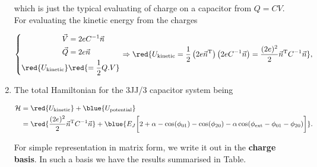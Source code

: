 \begin{enumerate}
  \noindent which is just the typical  evaluating of charge on a capacitor from $ Q =  CV $.  For evaluating the kinetic
  energy from the charges

  \begin{equation}
    \left\lbrace \begin{aligned}
        \vec{V} & = 2eC^{-1}\vec{n}\\
        \vec{Q} & = 2e\vec{n}\\
        \red{U_{\text{kinetic}}} & \red{= \frac{1}{2}Q.V}\\
      \end{aligned}\right.  \Rightarrow \red{U_{\text{kinetic}} =
      \frac{1}{2}\left(2e\vec{n}^{\text{T}}\right)\left(2eC^{-1}\vec{n}\right)               =
      \frac{(2e)^2}{2}\vec{n}^{\text{T}}C^{-1}\vec{n}},
  \end{equation}


\item The total Hamiltonian for the 3JJ/3 capacitor system being

  \begin{equation}
    \label{eqn:l23JJ}
    \begin{aligned}
      \mathcal{H}      &       =      \red{U_{\text{kinetic}}}       +      \blue{U_{\text{potential}}}\\       &      =
      \red{\frac{(2e)^2}{2}\vec{n}^{\text{T}}C^{-1}\vec{n}}    +    \blue{E_J\bigg[2+\alpha    -    \cos(\phi_{01})    -
        \cos(\phi_{20}) - \alpha\cos(\phi_\text{ext}-\phi_{01} - \phi_{20})\bigg]}.
    \end{aligned}
  \end{equation}

  For simple representation in matrix  form, we write it out in the \textbf{charge basis}.  In  such a basis we have the
  results summarised in Table.


\end{enumerate}
